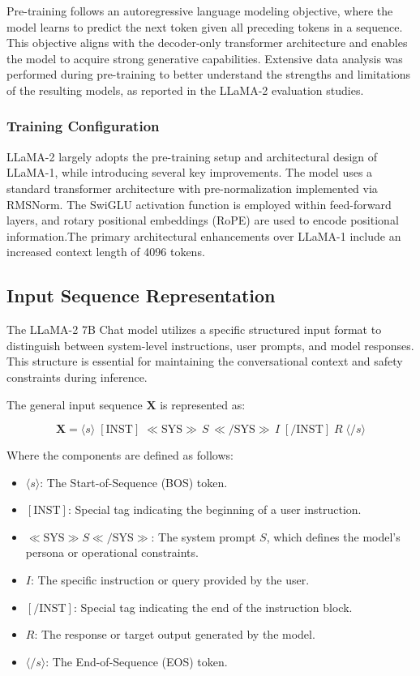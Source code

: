 Pre-training follows an autoregressive language modeling objective, where the
model learns to predict the next token given all preceding tokens in a sequence.
This objective aligns with the decoder-only transformer architecture and enables
the model to acquire strong generative capabilities. Extensive data analysis was
performed during pre-training to better understand the strengths and
limitations of the resulting models, as reported in the LLaMA-2 evaluation
studies.

\subsubsection{Training Configuration}
LLaMA-2 largely adopts the pre-training setup and architectural design of LLaMA-1,
while introducing several key improvements. The model
uses a standard transformer architecture with
pre-normalization implemented via RMSNorm. The SwiGLU
activation function is employed within feed-forward layers,
and rotary positional embeddings (RoPE) are used to encode
positional information.The primary architectural enhancements over LLaMA-1 include an increased context
length of 4096 tokens.

\subsection{Input Sequence Representation}
The LLaMA-2 7B Chat model utilizes a specific structured input format to distinguish between system-level instructions, user prompts, and model responses. This structure is essential for maintaining the conversational context and safety constraints during inference. 

The general input sequence $\mathbf{X}$ is represented as:

\begin{equation}
\mathbf{X} = \langle s \rangle \; [\text{INST}] \; \ll \text{SYS} \gg \, S \, \ll / \text{SYS} \gg \, I \; [/\text{INST}] \; R \; \langle /s \rangle
\end{equation}

Where the components are defined as follows:
\begin{itemize}
    \item $\langle s \rangle$: The Start-of-Sequence (BOS) token.
    \item $[\text{INST}]$: Special tag indicating the beginning of a user instruction.
    \item $\ll \text{SYS} \gg S \ll / \text{SYS} \gg$: The system prompt $S$, which defines the model's persona or operational constraints.
    \item $I$: The specific instruction or query provided by the user.
    \item $[/\text{INST}]$: Special tag indicating the end of the instruction block.
    \item $R$: The response or target output generated by the model.
    \item $\langle /s \rangle$: The End-of-Sequence (EOS) token.
\end{itemize}

